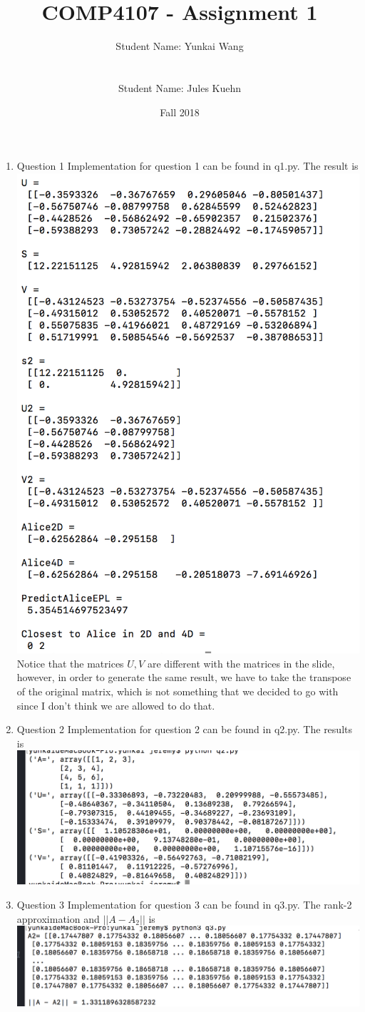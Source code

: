 \documentclass[11pt]{article}
\title{COMP4107 - Assignment 1}
\author{Student Name: Yunkai Wang\\
\text{Student Number: 100968473}\\\\
Student Name: Jules Kuehn\\
\text{Student Number: 100661464}}
\date{Fall 2018}
\begin{document}
\maketitle
\begin{enumerate}

\item Question 1
Implementation for question 1 can be found in q1.py. The result is\\
\includegraphics[width=0.5\columnwidth]{q1_result}\\
Notice that the matrices $U, V$ are different with the matrices in the slide, however, in order to generate the same result, we have to take the transpose of the original matrix, which is not something that we decided to go with since I don't think we are allowed to do that.

\item Question 2\newline
Implementation for question 2 can be found in q2.py. The results is\\
\includegraphics{q2_result}

\item Question 3\newline
Implementation for question 3 can be found in q3.py. The rank-2 approximation and $||A-A_2||$ is\\
\includegraphics{q3_result}


\end{enumerate}
\end{document}
